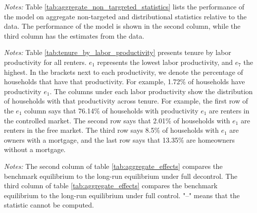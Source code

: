 \documentclass[parskip=full]{article}
\newenvironment{fignote2}[1]
{
\par
\medskip
\begin{minipage}{#1}
\footnotesize
}
{
\end{minipage}
}
\begin{document}
\begin{table}[H]
    \centering
    \caption{Aggregate non-targeted statistics}
    \vspace{-0.5cm}
    \label{tab:aggregate_non_targreted_statistics}  
    \vspace{-0.45cm}
    \begin{fignote2}{0.91\textwidth}
      \textit{Notes:} Table \ref{tab:aggregate_non_targreted_statistics} lists the performance of the model on aggregate non-targeted and distributional statistics relative to the data. The performance of the model is shown in the second column, while the third column has the estimates from the data. 
    \end{fignote2}
\end{table}

\begin{table}[H]
    \centering
    \caption{Tenure by labor productivity for all households in benchmark}
    \vspace{-0.5cm}
    \label{tab:tenure_by_labor_productivity}    
    \vspace{-0.45cm}
    \begin{fignote2}{0.96\textwidth}
      \textit{Notes:} Table \ref{tab:tenure_by_labor_productivity} presents tenure by labor  productivity for all renters. $e_{1}$ represents the lowest labor productivity, and $e_{7}$ the highest. In the brackets next to each productivity, we denote the percentage of households that have that productivity. For example, 1.72\% of households have productivity $e_{1}$. The columns under each labor productivity show the distribution of households with that productivity across tenure. For example, the first row of the $e_{1}$ column says that 76.14\% of households with productivity $e_{1}$ are renters in the controlled market. The second row says that 2.01\% of households with $e_{1}$ are renters in the free market. The third row says 8.5\% of households with $e_{1}$ are owners with a mortgage, and the last row says that 13.35\% are homeowners without a mortgage.
    \end{fignote2}
\end{table}

\begin{table}[H]
    \centering
    \caption{Aggregate effects}
    \vspace{-0.5cm}
    \label{tab:aggregate_effects}
    
    \vspace{-0.45cm}
    \begin{fignote2}{0.66\textwidth}
      \textit{Notes:} The second column of table \ref{tab:aggregate_effects} compares the benchmark equilibrium to the long-run equilibrium under full decontrol. The third column of table \ref{tab:aggregate_effects} compares the benchmark equilibrium to the long-run equilibrium under full control. "--" means that the statistic cannot be computed.
    \end{fignote2}
\end{table}
\end{document}
